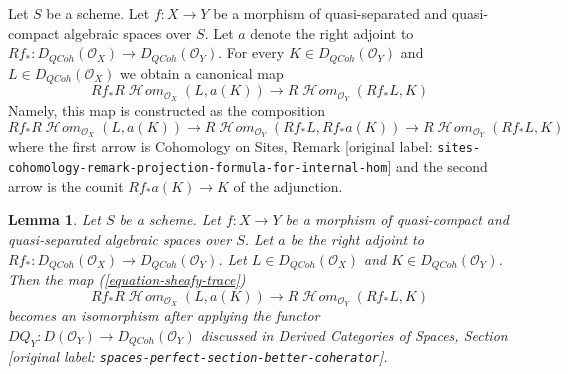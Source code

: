 \documentclass[10pt,a4paper]{article}
\theoremstyle{plain}
\newtheorem{lemma}[subsection]{Lemma}
\theoremstyle{definition}
\theoremstyle{remark}
\numberwithin{equation}{subsection}
\def\SheafHom{\mathop{\mathcal{H}\!\mathit{om}}\nolimits}
\def\QCoh{\mathit{QCoh}}
\begin{document}
\noindent
Let $S$ be a scheme.
Let $f : X \to Y$ be a morphism of quasi-separated and quasi-compact
algebraic spaces over $S$.
Let $a$ denote the right adjoint to
$Rf_* : D_\QCoh(\mathcal{O}_X) \to D_\QCoh(\mathcal{O}_Y)$. For every
$K \in D_\QCoh(\mathcal{O}_Y)$ and $L \in D_\QCoh(\mathcal{O}_X)$
we obtain a canonical map
\begin{equation}
\label{equation-sheafy-trace}
Rf_*R\SheafHom_{\mathcal{O}_X}(L, a(K))
\longrightarrow
R\SheafHom_{\mathcal{O}_Y}(Rf_*L, K)
\end{equation}
Namely, this map is constructed as the composition
$$
Rf_*R\SheafHom_{\mathcal{O}_X}(L, a(K)) \to
R\SheafHom_{\mathcal{O}_Y}(Rf_*L, Rf_*a(K)) \to
R\SheafHom_{\mathcal{O}_Y}(Rf_*L, K)
$$
where the first arrow is 
Cohomology on Sites, Remark
\textnormal{[original label: \nolinkurl{sites-cohomology-remark-projection-formula-for-internal-hom}]}
and the second arrow is the counit $Rf_*a(K) \to K$ of the adjunction.

\begin{lemma}
\label{lemma-iso-on-RSheafHom}
Let $S$ be a scheme.
Let $f : X \to Y$ be a morphism of quasi-compact and quasi-separated
algebraic spaces over $S$.
Let $a$ be the right adjoint to
$Rf_* : D_\QCoh(\mathcal{O}_X) \to D_\QCoh(\mathcal{O}_Y)$.
Let $L \in D_\QCoh(\mathcal{O}_X)$ and
$K \in D_\QCoh(\mathcal{O}_Y)$.
Then the map (\ref{equation-sheafy-trace})
$$
Rf_*R\SheafHom_{\mathcal{O}_X}(L, a(K))
\longrightarrow
R\SheafHom_{\mathcal{O}_Y}(Rf_*L, K)
$$
becomes an isomorphism after applying the functor
$DQ_Y : D(\mathcal{O}_Y) \to D_\QCoh(\mathcal{O}_Y)$
discussed in Derived Categories of Spaces, Section
\textnormal{[original label: \nolinkurl{spaces-perfect-section-better-coherator}]}.
\end{lemma}
\end{document}

